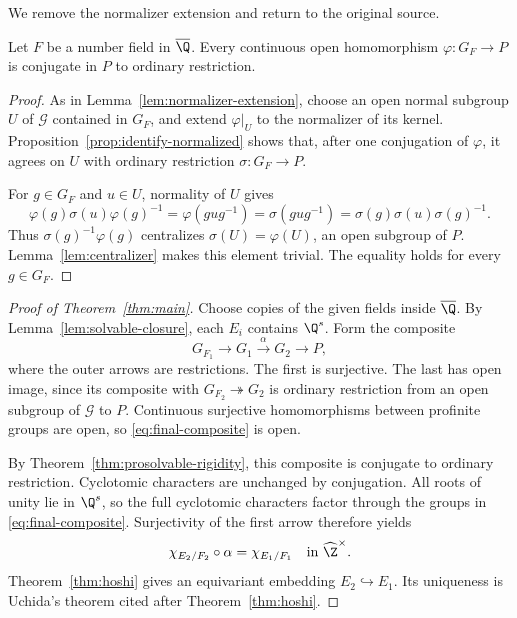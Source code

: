 We remove the normalizer extension and return to the original source.
\begin{theorem}\label{thm:prosolvable-rigidity}
Let $F$ be a number field in $\overline{\Q}$. Every continuous open homomorphism $\varphi:G_F\to P$ is conjugate in $P$ to ordinary restriction.
\end{theorem}
\begin{proof}
As in Lemma~\ref{lem:normalizer-extension}, choose an open normal subgroup $U$ of $\mathcal G$ contained in $G_F$, and extend $\varphi|_U$ to the normalizer of its kernel. Proposition~\ref{prop:identify-normalized} shows that, after one conjugation of $\varphi$, it agrees on $U$ with ordinary restriction $\sigma:G_F\to P$.

For $g\in G_F$ and $u\in U$, normality of $U$ gives
\[
 \varphi(g)\sigma(u)\varphi(g)^{-1}
 =\varphi(gug^{-1})
 =\sigma(gug^{-1})
 =\sigma(g)\sigma(u)\sigma(g)^{-1}.
\]
Thus $\sigma(g)^{-1}\varphi(g)$ centralizes $\sigma(U)=\varphi(U)$, an open subgroup of $P$. Lemma~\ref{lem:centralizer} makes this element trivial. The equality holds for every $g\in G_F$.
\end{proof}

\begin{proof}[Proof of Theorem~\ref{thm:main}]
Choose copies of the given fields inside $\overline{\Q}$. By Lemma~\ref{lem:solvable-closure}, each $E_i$ contains $\Q^s$. Form the composite
\begin{equation}\label{eq:final-composite}
 G_{F_1}\longrightarrow G_1\xrightarrow{\alpha}G_2
     \longrightarrow P,
\end{equation}
where the outer arrows are restrictions. The first is surjective. The last has open image, since its composite with $G_{F_2}\twoheadrightarrow G_2$ is ordinary restriction from an open subgroup of $\mathcal G$ to $P$. Continuous surjective homomorphisms between profinite groups are open, so \eqref{eq:final-composite} is open.

By Theorem~\ref{thm:prosolvable-rigidity}, this composite is conjugate to ordinary restriction. Cyclotomic characters are unchanged by conjugation. All roots of unity lie in $\Q^s$, so the full cyclotomic characters factor through the groups in \eqref{eq:final-composite}. Surjectivity of the first arrow therefore yields
\[
 \chi_{E_2/F_2}\circ\alpha=\chi_{E_1/F_1}
 \quad\text{in }\widehat{\Z}^{\times}.
\]
Theorem~\ref{thm:hoshi} gives an equivariant embedding $E_2\hookrightarrow E_1$. Its uniqueness is Uchida's theorem cited after Theorem~\ref{thm:hoshi}.
\end{proof}
